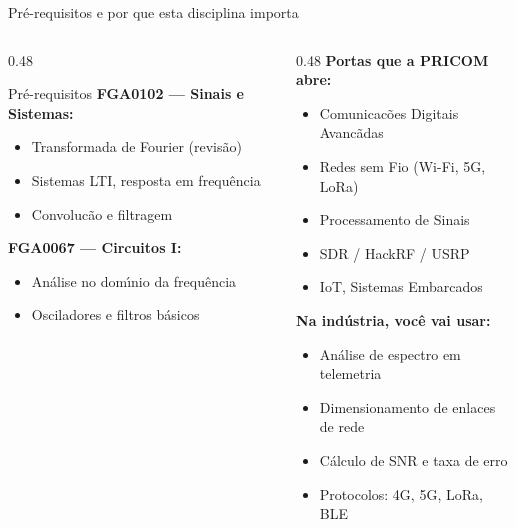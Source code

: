 \documentclass[aspectratio=169]{beamer}
\begin{document}
\begin{frame}{Pr\'{e}-requisitos e por que esta disciplina importa}
\begin{columns}
\begin{column}{0.48\textwidth}
  \begin{block}{Pr\'{e}-requisitos}
  \textbf{FGA0102 --- Sinais e Sistemas:}
  \begin{itemize}
    \item Transformada de Fourier (revis\~{a}o)
    \item Sistemas LTI, resposta em frequ\^{e}ncia
    \item Convoluc\~{a}o e filtragem
  \end{itemize}
  \vspace{0.2cm}
  \textbf{FGA0067 --- Circuitos I:}
  \begin{itemize}
    \item An\'{a}lise no dom\'{\i}nio da frequ\^{e}ncia
    \item Osciladores e filtros b\'{a}sicos
  \end{itemize}
  \end{block}
  \vspace{0.1cm}
\end{column}
\begin{column}{0.48\textwidth}
  \textbf{Portas que a PRICOM abre:}
  \begin{itemize}
    \item Comunicac\~{o}es Digitais Avanc\~{a}das
    \item Redes sem Fio (Wi-Fi, 5G, LoRa)
    \item Processamento de Sinais
    \item SDR / HackRF / USRP
    \item IoT, Sistemas Embarcados
  \end{itemize}
  \vspace{0.1cm}
  \textbf{Na ind\'{u}stria, voc\^{e} vai usar:}
  \begin{itemize}
    \item An\'{a}lise de espectro em telemetria
    \item Dimensionamento de enlaces de rede
    \item C\'{a}lculo de SNR e taxa de erro
    \item Protocolos: 4G, 5G, LoRa, BLE
  \end{itemize}
\end{column}
\end{columns}
\end{frame}
\end{document}
